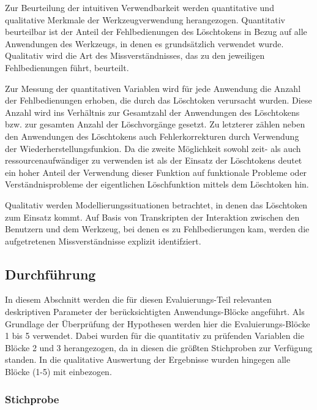 Zur Beurteilung der intuitiven Verwendbarkeit werden quantitative und qualitative Merkmale der Werkzeugverwendung herangezogen. Quantitativ beurteilbar ist der Anteil der Fehlbedienungen des Löschtokens in Bezug auf alle Anwendungen des Werkzeugs, in denen es grundsätzlich verwendet wurde. Qualitativ wird die Art des Missverständnisses, das zu den jeweiligen Fehlbedienungen führt, beurteilt.

Zur Messung der quantitativen Variablen wird für jede Anwendung die Anzahl der Fehlbedienungen erhoben, die durch das Löschtoken verursacht wurden. Diese Anzahl wird ins Verhältnis zur Gesamtzahl der Anwendungen des Löschtokens bzw. zur gesamten Anzahl der Löschvorgänge gesetzt. Zu letzterer zählen neben den Anwendungen des Löschtokens auch Fehlerkorrekturen durch Verwendung der Wiederherstellungsfunkion. Da die zweite Möglichkeit sowohl zeit- als auch ressourcenaufwändiger zu verwenden ist als der Einsatz der Löschtokens deutet ein hoher Anteil der Verwendung dieser Funktion auf funktionale Probleme oder Verständnisprobleme der eigentlichen Löschfunktion mittels dem Löschtoken hin.  

Qualitativ werden Modellierungssituationen betrachtet, in denen das Löschtoken zum Einsatz kommt. Auf Basis von Transkripten der Interaktion zwischen den Benutzern und dem Werkzeug, bei denen es zu Fehlbedierungen kam, werden die aufgetretenen Missverständnisse explizit identifziert.



\subsection{Durchführung} %
\label{sub:durchführung}

In diesem Abschnitt werden die für diesen Evaluierungs-Teil relevanten deskriptiven Parameter der berücksichtigten Anwendungs-Blöcke angeführt.
Als Grundlage der Überprüfung der Hypothesen werden hier die Evaluierungs-Blöcke 1 bis 5 verwendet. Dabei wurden für die quantitativ zu prüfenden Variablen die Blöcke 2 und 3 herangezogen, da in diesen die größten Stichproben zur Verfügung standen. In die qualitative Auswertung der Ergebnisse wurden hingegen alle Blöcke (1-5) mit einbezogen.

\subsubsection{Stichprobe} %

